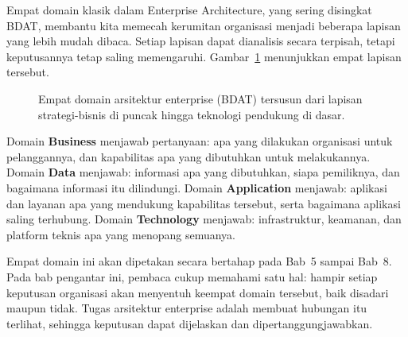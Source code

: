 Empat domain klasik dalam Enterprise Architecture, yang sering disingkat BDAT,
membantu kita memecah kerumitan organisasi menjadi beberapa lapisan yang lebih
mudah dibaca. Setiap lapisan dapat dianalisis secara terpisah, tetapi
keputusannya tetap saling memengaruhi. Gambar~\ref{fig:bdat-stack}
menunjukkan empat lapisan tersebut.

\begin{figure}[htbp]
\centering
{}
\caption{Empat domain arsitektur enterprise (BDAT) tersusun dari lapisan
strategi-bisnis di puncak hingga teknologi pendukung di dasar.}
\label{fig:bdat-stack}
\end{figure}

Domain \textbf{Business} menjawab pertanyaan: apa yang dilakukan organisasi
untuk pelanggannya, dan kapabilitas apa yang dibutuhkan untuk melakukannya.
Domain \textbf{Data} menjawab: informasi apa yang dibutuhkan, siapa
pemiliknya, dan bagaimana informasi itu dilindungi. Domain
\textbf{Application} menjawab: aplikasi dan layanan apa yang mendukung
kapabilitas tersebut, serta bagaimana aplikasi saling terhubung. Domain
\textbf{Technology} menjawab: infrastruktur, keamanan, dan platform teknis apa
yang menopang semuanya.

Empat domain ini akan dipetakan secara bertahap pada Bab~5 sampai Bab~8. Pada
bab pengantar ini, pembaca cukup memahami satu hal: hampir setiap keputusan
organisasi akan menyentuh keempat domain tersebut, baik disadari maupun tidak.
Tugas arsitektur enterprise adalah membuat hubungan itu terlihat, sehingga
keputusan dapat dijelaskan dan dipertanggungjawabkan.

